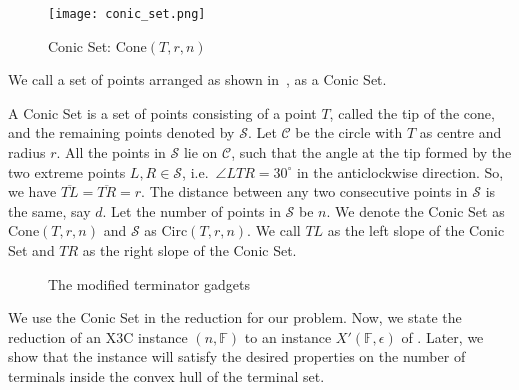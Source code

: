 \begin{figure}[h]
\centering
\texttt{[image: conic\_set.png]}
\caption{Conic Set: $\mathrm{Cone}(T,r,n)$}
\label{fig:conic_set}
\end{figure}

We call a set of points arranged as shown in~, as a Conic Set.
\begin{definition} \label{def:conic_set}
    A Conic Set is a set of points consisting of a point $T$, called the tip of the cone, and the remaining points denoted by $\mathcal{S}$. Let $\mathcal{C}$ be the circle with $T$ as centre and radius $r$. All the points in $\mathcal{S}$ lie on $\mathcal{C}$, such that the angle at the tip formed by the two extreme points $L,R \in \mathcal{S}$, i.e.~$\angle{LTR} = 30^\circ$ in the anticlockwise direction. So, we have $\overline{TL} = \overline{TR} = r$. The distance between any two consecutive points in $\mathcal{S}$ is the same, say $d$. Let the number of points in $\mathcal{S}$ be $n$. We denote the Conic Set as $\mathrm{Cone}(T,r,n)$ and $\mathcal{S}$ as $\mathrm{Circ}(T,r,n)$. We call $TL$ as the left slope of the Conic Set and $TR$ as the right slope of the Conic Set.
\end{definition}

\begin{figure}[h] 
\centering
{}   \qquad\qquad\qquad\qquad\qquad\qquad
{}
    \qquad\qquad
{}
\caption{The modified terminator gadgets}  
\label{fig:terminator_new}
\end{figure}


We use the Conic Set in the reduction for our problem. Now, we state the reduction of an X3C instance $(n,\mathbb{F})$ to an instance $X'(\mathbb{F},\epsilon)$ of \ESMT. Later, we show that the instance will satisfy the desired properties on the number of terminals inside the convex hull of the terminal set.

